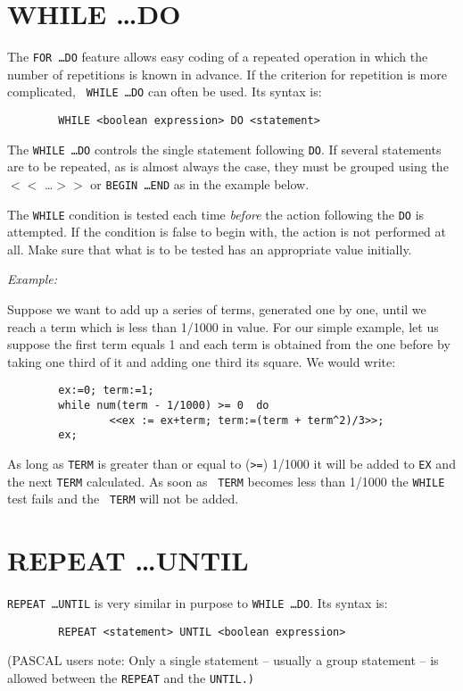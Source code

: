 \documentclass[11pt,letterpaper]{book}
\makeatletter
\newcommand{\underscore}{\_}
\newcommand{\ttindex}[1]{{\renewcommand{\_}{\protect\underscore}%
                          \index{#1@{\tt #1}}}}
\makeatother
\begin{document}
\section{WHILE \ldots DO}

The\ttindex{WHILE} {\tt FOR \ldots DO}\ttindex{DO} feature allows easy
coding of a repeated operation in which the number of repetitions is known
in advance.  If the criterion for repetition is more complicated, {\tt
WHILE \ldots DO} can often be used.  Its syntax is:
{\small\begin{verbatim}
        WHILE <boolean expression> DO <statement>
\end{verbatim}}
The {\tt WHILE \ldots DO} controls the single statement following {\tt DO}.
If several statements are to be repeated, as is almost always the case,
they must be grouped using the $<<$ \ldots $>>$ or {\tt BEGIN \ldots END}
as in the example below.

The {\tt WHILE} condition is tested each time {\em before\/} the action
following the {\tt DO} is attempted.  If the condition is false to begin
with, the action is not performed at all.  Make sure that what is to be
tested has an appropriate value initially.

{\it Example:}

Suppose we want to add up a series of terms, generated one by one, until
we reach a term which is less than 1/1000 in value.  For our simple
example, let us suppose the first term equals 1 and each term is obtained
from the one before by taking one third of it and adding one third its
square. We would write:
{\small\begin{verbatim}
        ex:=0; term:=1;
        while num(term - 1/1000) >= 0  do
                <<ex := ex+term; term:=(term + term^2)/3>>;
        ex;
\end{verbatim}}
As long as {\tt TERM} is greater than or equal to ({\tt >=}) 1/1000 it will
be added to {\tt EX} and the next {\tt TERM} calculated.  As soon as {\tt
TERM} becomes less than 1/1000 the {\tt WHILE} test fails and the {\tt
TERM} will not be added.


\section{REPEAT \ldots UNTIL}

\ttindex{REPEAT} {\tt REPEAT \ldots  UNTIL} is very similar in purpose to
{\tt WHILE \ldots DO}.  Its syntax is:
{\small\begin{verbatim}
        REPEAT <statement> UNTIL <boolean expression>
\end{verbatim}}
(PASCAL users note: Only a single statement -- usually a group statement
-- is allowed between the {\tt REPEAT} and the {\tt UNTIL.)}
\end{document}
